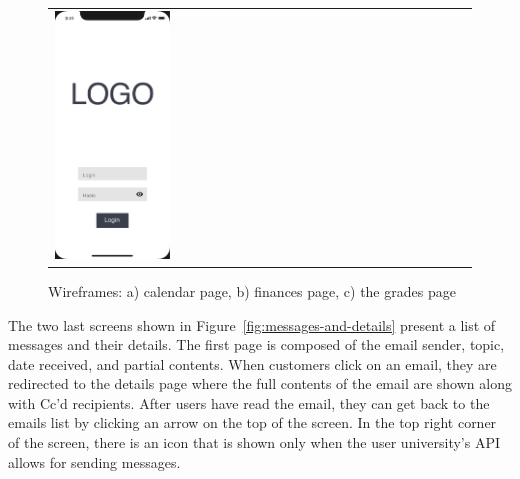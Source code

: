 \begin{figure}[htb]
\begin{tabular}{@{}lll@{}}
        \includegraphics[page=3,width=0.300\textwidth]{fig04/jsos_helper_wireframe.pdf} \\
    \end{tabular}
    \caption{Wireframes: a) calendar page, b) finances page, c) the grades page} \label{fig:calendar-finances-grades}
\end{figure}

The two last screens shown in Figure~\ref{fig:messages-and-details} present a list of messages and their details. The first page is composed of the email sender, topic, date received, and partial contents. When customers click on an email, they are redirected to the details page where the full contents of the email are shown along with Cc'd recipients. After users have read the email, they can get back to the emails list by clicking an arrow on the top of the screen. In the top right corner of the screen, there is an icon that is shown only when the user university's API allows for sending messages.

